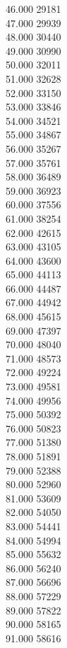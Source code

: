{ 46.000	29181 \\
 47.000	29939 \\
 48.000	30440 \\
 49.000	30990 \\
 50.000	32011 \\
 51.000	32628 \\
 52.000	33150 \\
 53.000	33846 \\
 54.000	34521 \\
 55.000	34867 \\
 56.000	35267 \\
 57.000	35761 \\
 58.000	36489 \\
 59.000	36923 \\
 60.000	37556 \\
 61.000	38254 \\
 62.000	42615 \\
 63.000	43105 \\
 64.000	43600 \\
 65.000	44113 \\
 66.000	44487 \\
 67.000	44942 \\
 68.000	45615 \\
 69.000	47397 \\
 70.000	48040 \\
 71.000	48573 \\
 72.000	49224 \\
 73.000	49581 \\
 74.000	49956 \\
 75.000	50392 \\
 76.000	50823 \\
 77.000	51380 \\
 78.000	51891 \\
 79.000	52388 \\
 80.000	52960 \\
 81.000	53609 \\
 82.000	54050 \\
 83.000	54441 \\
 84.000	54994 \\
 85.000	55632 \\
 86.000	56240 \\
 87.000	56696 \\
 88.000	57229 \\
 89.000	57822 \\
 90.000	58165 \\
 91.000	58616 \\
}
